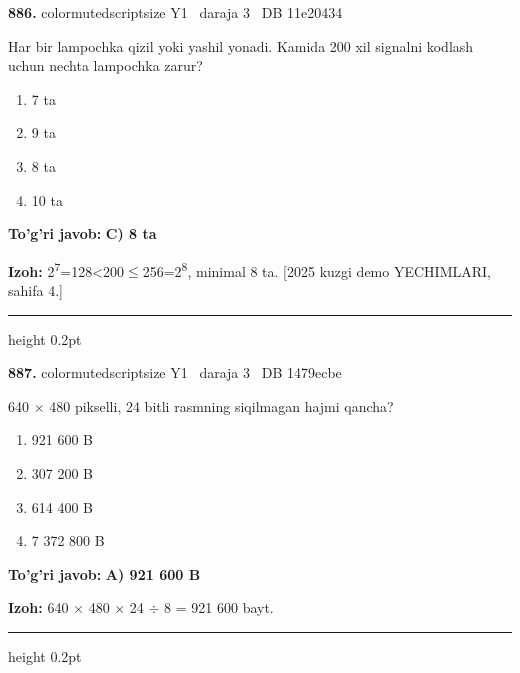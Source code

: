 \documentclass[10pt,a4paper,oneside]{article}
\begin{document}
\noindent\textbf{\color{ink}886.}  {color{muted}scriptsize Y1 \textbullet\ daraja 3 \textbullet\ DB 11e20434}
\par
Har bir lampochka qizil yoki yashil yonadi. Kamida 200 xil signalni kodlash uchun nechta lampochka zarur?
\begin{enumerate}[label=\Alph*),leftmargin=9mm]
\item 7 ta
\item 9 ta
\item 8 ta
\item 10 ta
\end{enumerate}
\begin{tcolorbox}[enhanced,breakable,colback=teal!4,colframe=teal!50!black,boxrule=0.5pt,arc=1.1mm,left=3mm,right=3mm,top=1.7mm,bottom=1.7mm,before skip=2mm,after skip=2mm]
\textbf{\color{teal}To'g'ri javob:} \textbf{C) 8 ta}
\par\smallskip
\textbf{Izoh:} 2\textsuperscript{7}=128\textless{}200\ensuremath{\leq}256=2\textsuperscript{8}, minimal 8 ta. [2025 kuzgi demo YECHIMLARI, sahifa 4.]
\end{tcolorbox}
\vspace{2mm}\hrule height 0.2pt \vspace{3mm}

\noindent\textbf{\color{ink}887.}  {color{muted}scriptsize Y1 \textbullet\ daraja 3 \textbullet\ DB 1479ecbe}
\par
640 \ensuremath{\times} 480 pikselli, 24 bitli rasmning siqilmagan hajmi qancha?
\begin{enumerate}[label=\Alph*),leftmargin=9mm]
\item 921 600 B
\item 307 200 B
\item 614 400 B
\item 7 372 800 B
\end{enumerate}
\begin{tcolorbox}[enhanced,breakable,colback=teal!4,colframe=teal!50!black,boxrule=0.5pt,arc=1.1mm,left=3mm,right=3mm,top=1.7mm,bottom=1.7mm,before skip=2mm,after skip=2mm]
\textbf{\color{teal}To'g'ri javob:} \textbf{A) 921 600 B}
\par\smallskip
\textbf{Izoh:} 640 \ensuremath{\times} 480 \ensuremath{\times} 24 \ensuremath{\div} 8 = 921 600 bayt.
\end{tcolorbox}
\vspace{2mm}\hrule height 0.2pt \vspace{3mm}
\end{document}
